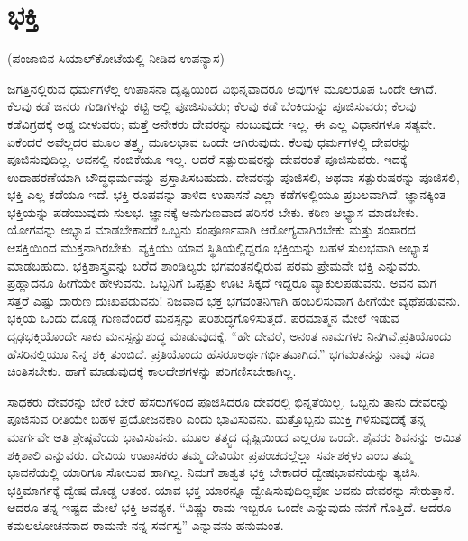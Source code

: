 
\chapter{ಭಕ್ತಿ}

\begin{center}
(ಪಂಜಾಬಿನ ಸಿಯಾಲ್​ಕೋಟೆಯಲ್ಲಿ ನೀಡಿದ ಉಪನ್ಯಾಸ)
\end{center}

\vskip 2pt

ಜಗತ್ತಿನಲ್ಲಿರುವ ಧರ್ಮಗಳೆಲ್ಲ ಉಪಾಸನಾ ದೃಷ್ಟಿಯಿಂದ ವಿಭಿನ್ನವಾದರೂ ಅವುಗಳ ಮೂಲರೂಪ ಒಂದೇ ಆಗಿದೆ. ಕೆಲವು ಕಡೆ ಜನರು ಗುಡಿಗಳನ್ನು ಕಟ್ಟಿ ಅಲ್ಲಿ ಪೂಜಿಸುವರು; ಕೆಲವು ಕಡೆ ಬೆಂಕಿಯನ್ನು ಪೂಜಿಸುವರು; ಕೆಲವು ಕಡೆ\break ವಿಗ್ರಹಕ್ಕೆ ಅಡ್ಡ ಬೀಳುವರು; ಮತ್ತೆ ಅನೇಕರು ದೇವರನ್ನು ನಂಬುವುದೇ ಇಲ್ಲ. ಈ ಎಲ್ಲ ವಿಧಾನಗಳೂ ಸತ್ಯವೇ. ಏಕೆಂದರೆ ಅವೆಲ್ಲದರ ಮೂಲ ತತ್ತ್ವ, ಮೂಲಭಾವ ಒಂದೇ ಆಗಿರುವುದು. ಕೆಲವು ಧರ್ಮಗಳಲ್ಲಿ ದೇವರನ್ನು ಪೂಜಿಸುವುದಿಲ್ಲ. ಅವನಲ್ಲಿ ನಂಬಿಕೆಯೂ ಇಲ್ಲ. ಆದರೆ ಸತ್ಪುರುಷರನ್ನು ದೇವರಂತೆ ಪೂಜಿಸುವರು. ಇದಕ್ಕೆ ಉದಾಹರಣೆಯಾಗಿ ಬೌದ್ಧಧರ್ಮವನ್ನು ಪ್ರಸ್ತಾಪಿಸಬಹುದು. ದೇವರನ್ನು ಪೂಜಿಸಲಿ, ಅಥವಾ ಸತ್ಪುರುಷರನ್ನು ಪೂಜಿಸಲಿ, ಭಕ್ತಿ ಎಲ್ಲ ಕಡೆಯೂ ಇದೆ. ಭಕ್ತಿ ರೂಪವನ್ನು ತಾಳಿದ ಉಪಾಸನೆ ಎಲ್ಲಾ ಕಡೆಗಳಲ್ಲಿಯೂ ಪ್ರಬಲವಾಗಿದೆ. ಜ್ಞಾನಕ್ಕಿಂತ ಭಕ್ತಿಯನ್ನು ಪಡೆಯುವುದು ಸುಲಭ. ಜ್ಞಾನಕ್ಕೆ ಅನುಗುಣವಾದ ಪರಿಸರ ಬೇಕು. ಕಠಿಣ ಅಭ್ಯಾಸ ಮಾಡಬೇಕು. ಯೋಗವನ್ನು ಅಭ್ಯಾಸ ಮಾಡಬೇಕಾದರೆ ಒಬ್ಬನು ಸಂಪೂರ್ಣವಾಗಿ ಆರೋಗ್ಯವಾಗಿರಬೇಕು ಮತ್ತು ಸಂಸಾರದ ಆಸಕ್ತಿಯಿಂದ ಮುಕ್ತನಾಗಿರಬೇಕು. ವ್ಯಕ್ತಿಯು ಯಾವ ಸ್ಥಿತಿ\-ಯಲ್ಲಿದ್ದರೂ ಭಕ್ತಿಯನ್ನು ಬಹಳ ಸುಲಭವಾಗಿ ಅಭ್ಯಾಸ ಮಾಡಬಹುದು. ಭಕ್ತಿಶಾಸ್ತ್ರವನ್ನು ಬರೆದ ಶಾಂಡಿಲ್ಯರು ಭಗವಂತನಲ್ಲಿರುವ ಪರಮ ಪ್ರೇಮವೇ ಭಕ್ತಿ ಎನ್ನುವರು. ಪ್ರಹ್ಲಾದನೂ ಹೀಗೆಯೇ ಹೇಳುವನು. ಒಬ್ಬನಿಗೆ ಒಪ್ಪತ್ತು ಊಟ ಸಿಕ್ಕದೆ ಇದ್ದರೂ ವ್ಯಾಕುಲಪಡುವನು. ಅವನ ಮಗ ಸತ್ತರೆ ಎಷ್ಟು ದಾರುಣ ದುಃಖಪಡುವನು! ನಿಜವಾದ ಭಕ್ತ ಭಗವಂತನಿಗಾಗಿ ಹಂಬಲಿಸುವಾಗ ಹೀಗೆಯೇ ವ್ಯಥೆಪಡುವನು. ಭಕ್ತಿಯ ಒಂದು ದೊಡ್ಡ ಗುಣವೆಂದರೆ ಮನಸ್ಸನ್ನು ಪರಿಶುದ್ಧಗೊಳಿಸುತ್ತದೆ. ಪರಮಾತ್ಮನ ಮೇಲೆ ಇಡುವ ದೃಢಭಕ್ತಿಯೊಂದೇ ಸಾಕು ಮನಸ್ಸನ್ನು\break ಶುದ್ಧ ಮಾಡುವುದಕ್ಕೆ. “ಹೇ ದೇವರೆ, ಅನಂತ ನಾಮಗಳು ನಿನಗಿವೆ.\break ಪ್ರತಿಯೊಂದು ಹೆಸರಿನಲ್ಲಿಯೂ ನಿನ್ನ ಶಕ್ತಿ ತುಂಬಿದೆ. ಪ್ರತಿಯೊಂದು ಹೆಸರೂ\break ಅರ್ಥಗರ್ಭಿತವಾಗಿದೆ.” ಭಗವಂತನನ್ನು ನಾವು ಸದಾ ಚಿಂತಿಸಬೇಕು. ಹಾಗೆ ಮಾಡುವುದಕ್ಕೆ ಕಾಲದೇಶಗಳನ್ನು ಪರಿಗಣಿಸಬೇಕಾಗಿಲ್ಲ.

ಸಾಧಕರು ದೇವರನ್ನು ಬೇರೆ ಬೇರೆ ಹೆಸರುಗಳಿಂದ ಪೂಜಿಸಿದರೂ ದೇವರಲ್ಲಿ ಭಿನ್ನತೆಯಿಲ್ಲ. ಒಬ್ಬನು ತಾನು ದೇವರನ್ನು ಪೂಜಿಸುವ ರೀತಿಯೇ ಬಹಳ ಪ್ರಯೋಜನಕಾರಿ ಎಂದು ಭಾವಿಸುವನು. ಮತ್ತೊಬ್ಬನು ಮುಕ್ತಿ ಗಳಿಸುವುದಕ್ಕೆ ತನ್ನ ಮಾರ್ಗವೇ ಅತಿ ಶ್ರೇಷ್ಠವೆಂದು ಭಾವಿಸುವನು. ಮೂಲ ತತ್ತ್ವದ ದೃಷ್ಟಿಯಿಂದ ಎಲ್ಲರೂ ಒಂದೇ. ಶೈವರು ಶಿವನನ್ನು ಅಮಿತ ಶಕ್ತಿಶಾಲಿ ಎನ್ನುವರು. ದೇವಿಯ ಉಪಾಸಕರು ತಮ್ಮ ದೇವಿಯೇ ಪ್ರಪಂಚದಲ್ಲೆಲ್ಲಾ ಸರ್ವಶಕ್ತಳು ಎಂಬ ತಮ್ಮ ಭಾವನೆಯಲ್ಲಿ ಯಾರಿಗೂ ಸೋಲುವ ಹಾಗಿಲ್ಲ. ನಿಮಗೆ ಶಾಶ್ವತ ಭಕ್ತಿ ಬೇಕಾದರೆ ದ್ವೇಷಭಾವನೆಯನ್ನು ತ್ಯಜಿಸಿ. ಭಕ್ತಿಮಾರ್ಗಕ್ಕೆ ದ್ವೇಷ ದೊಡ್ಡ ಆತಂಕ. ಯಾವ ಭಕ್ತ ಯಾರನ್ನೂ ದ್ವೇಷಿಸುವುದಿಲ್ಲವೋ ಅವನು ದೇವರನ್ನು ಸೇರುತ್ತಾನೆ. ಆದರೂ ತನ್ನ ಇಷ್ಟದ ಮೇಲೆ ಭಕ್ತಿ ಅವಶ್ಯಕ. “ವಿಷ್ಣು ರಾಮ ಇಬ್ಬರೂ ಒಂದೇ ಎನ್ನುವುದು ನನಗೆ ಗೊತ್ತಿದೆ. ಆದರೂ ಕಮಲಲೋಚನನಾದ ರಾಮನೇ ನನ್ನ ಸರ್ವಸ್ವ” ಎನ್ನುವನು ಹನುಮಂತ.

